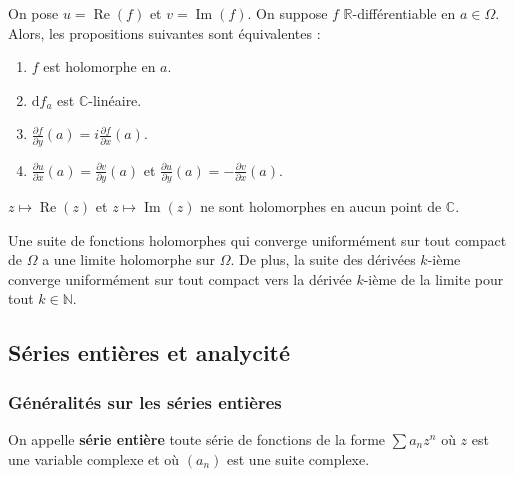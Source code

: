 
  \begin{theorem}
    On pose $u = \operatorname{Re}(f)$ et $v = \operatorname{Im}(f)$. On suppose $f$ $\mathbb{R}$-différentiable en $a \in \Omega$. Alors, les propositions suivantes sont équivalentes :
    \begin{enumerate}[label={\bfseries(\roman*)}]
      \item $f$ est holomorphe en $a$.
      \item $\mathrm{d}f_a$ est $\mathbb{C}$-linéaire.
      \item $\frac{\partial f}{\partial y} (a) = i \frac{\partial f}{\partial x} (a)$.
      \item $\frac{\partial u}{\partial x} (a) = \frac{\partial v}{\partial y} (a)$ et $\frac{\partial u}{\partial y} (a) = -\frac{\partial v}{\partial x} (a)$.
    \end{enumerate}
  \end{theorem}


  \begin{example}
    $z \mapsto \operatorname{Re}(z)$ et $z \mapsto \operatorname{Im}(z)$ ne sont holomorphes en aucun point de $\mathbb{C}$.
  \end{example}


  \begin{theorem}
    Une suite de fonctions holomorphes qui converge uniformément sur tout compact de $\Omega$ a une limite holomorphe sur $\Omega$. De plus, la suite des dérivées $k$-ième converge uniformément sur tout compact vers la dérivée $k$-ième de la limite pour tout $k \in \mathbb{N}$.
  \end{theorem}

  \subsection{Séries entières et analycité}

  \subsubsection{Généralités sur les séries entières}


  \begin{definition}
    On appelle \textbf{série entière} toute série de fonctions de la forme $\sum a_n z^n$ où $z$ est une variable complexe et où $(a_n)$ est une suite complexe.
  \end{definition}

